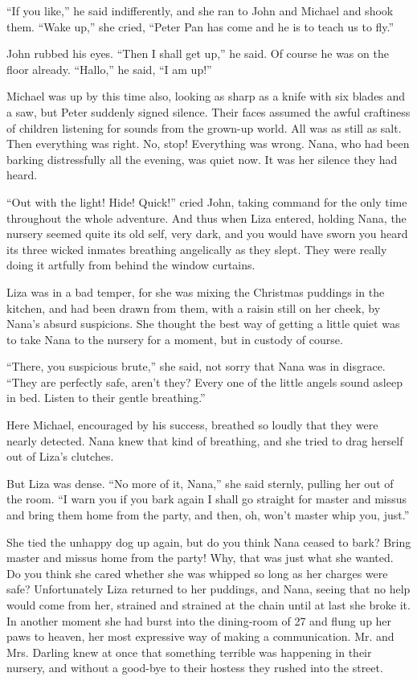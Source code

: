 ``If you like,'' he said indifferently, and she ran to John and Michael
and shook them. ``Wake up,'' she cried, ``Peter Pan has come and he is to
teach us to fly.''

John rubbed his eyes. ``Then I shall get up,'' he said. Of course he was
on the floor already. ``Hallo,'' he said, ``I am up!''

Michael was up by this time also, looking as sharp as a knife with six
blades and a saw, but Peter suddenly signed silence. Their faces
assumed the awful craftiness of children listening for sounds from the
grown-up world. All was as still as salt. Then everything was right.
No, stop! Everything was wrong. Nana, who had been barking
distressfully all the evening, was quiet now. It was her silence they
had heard.

``Out with the light! Hide! Quick!'' cried John, taking command for the
only time throughout the whole adventure. And thus when Liza entered,
holding Nana, the nursery seemed quite its old self, very dark, and you
would have sworn you heard its three wicked inmates breathing
angelically as they slept. They were really doing it artfully from
behind the window curtains.

Liza was in a bad temper, for she was mixing the Christmas puddings in
the kitchen, and had been drawn from them, with a raisin still on her
cheek, by Nana's absurd suspicions. She thought the best way of getting
a little quiet was to take Nana to the nursery for a moment, but in
custody of course.

``There, you suspicious brute,'' she said, not sorry that Nana was in
disgrace. ``They are perfectly safe, aren't they? Every one of the
little angels sound asleep in bed. Listen to their gentle breathing.''

Here Michael, encouraged by his success, breathed so loudly that they
were nearly detected. Nana knew that kind of breathing, and she tried
to drag herself out of Liza's clutches.

But Liza was dense. ``No more of it, Nana,'' she said sternly, pulling
her out of the room. ``I warn you if you bark again I shall go straight
for master and missus and bring them home from the party, and then, oh,
won't master whip you, just.''

She tied the unhappy dog up again, but do you think Nana ceased to
bark? Bring master and missus home from the party! Why, that was just
what she wanted. Do you think she cared whether she was whipped so long
as her charges were safe? Unfortunately Liza returned to her puddings,
and Nana, seeing that no help would come from her, strained and
strained at the chain until at last she broke it. In another moment she
had burst into the dining-room of 27 and flung up her paws to heaven,
her most expressive way of making a communication. Mr. and Mrs. Darling
knew at once that something terrible was happening in their nursery,
and without a good-bye to their hostess they rushed into the street.

